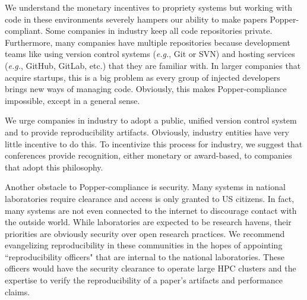 We understand the monetary incentives to propriety systems but working with
code in these environments severely hampers our ability to make papers
Popper-compliant.  Some companies in industry keep all code repositories
private.  Furthermore, many companies have multiple repositories because
development teams like using version control systems ({\it e.g.}, Git or SVN)
and hosting services ({\it e.g.}, GitHub, GitLab, etc.) that they are familiar
with. In larger companies that acquire startups, this is a big problem as every
group of injected developers brings new ways of managing code.  Obviously, this
makes Popper-compliance impossible, except in a general sense.  

We urge companies in industry to adopt a public, unified version control system
and to provide reproducibility artifacts. Obviously, industry entities have
very little incentive to do this. To incentivize this process for industry, we
suggest that conferences provide recognition, either monetary or award-based,
to companies that adopt this philosophy.

Another obstacle to Popper-compliance is security. Many systems in national
laboratories require clearance and access is only granted to US citizens. In
fact, many systems are not even connected to the internet to discourage contact
with the outside world. While laboratories are expected to be research havens,
their priorities are obviously security over open research practices. We
recommend evangelizing reproducibility in these communities in the hopes of
appointing ``reproducibility officers" that are internal to the national
laboratories. These officers would have the security clearance to operate large
HPC clusters and the expertise to verify the reproducibility of a paper's
artifacts and performance claims.

